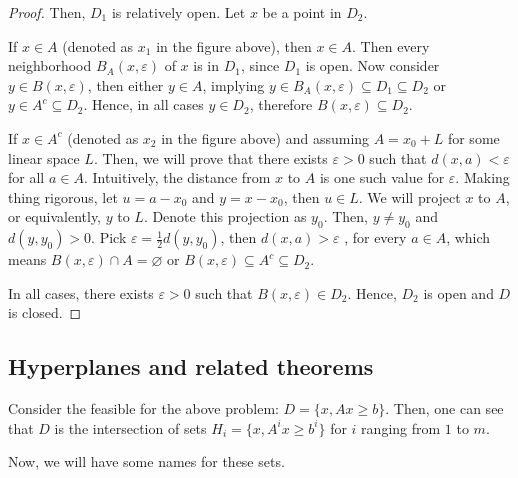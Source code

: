 \begin{proof}
  Then, \( D_{1} \) is relatively open. Let \( x \) be a point in \( D_{2} \).

  If \( x \in A \) (denoted as \( x_{1} \) in the figure above),
  then \( x \in A \). Then every neighborhood \( B_{A}(x,
  \varepsilon) \) of \( x \) is in \( D_{1} \), since \( D_{1} \) is open. Now
  consider \( y \in B(x, \varepsilon) \), then either \( y \in A \), implying \(
  y \in B_{A}(x, \varepsilon) \subseteq D_{1} \subseteq D_{2}\) or \( y \in
  A^{c} \subseteq D_{2} \). Hence, in all cases \( y \in D_{2} \), therefore \(
  B(x, \varepsilon) \subseteq D_{2}\).

  If \( x \in A^{c} \) (denoted as \( x_{2} \) in the figure above)
  and assuming \( A = x_{0} + L \) for some linear space \(
  L\). Then, we will prove that there exists \( \varepsilon > 0 \) such that \(
  d(x, a) < \varepsilon\) for all \( a \in A \). Intuitively, the distance from
  \( x \) to \( A \) is one such value for \( \varepsilon \).
  Making thing rigorous,
  let \( u = a - x_{0} \) and \( y = x - x_{0} \), then \( u \in L \). We will
  project \( x \) to \( A \), or equivalently, \( y \) to \( L \). Denote this
  projection as \( y_{0} \). Then, \( y \neq  y_{0} \) and \( d(y, y_{0}) > 0
  \). Pick \( \varepsilon = \frac{1}{2} d(y, y_{0}) \), then \( d(x, a) >
  \varepsilon \) , for every \( a \in A \), which means \( B(x, \varepsilon)
  \cap A = \varnothing \) or \( B(x, \varepsilon) \subseteq A^{c} \subseteq
  D_{2} \).

  In all cases, there exists \( \varepsilon > 0 \) such that \( B(x,
  \varepsilon) \in D_{2} \). Hence, \( D_{2} \) is open and \( D \) is closed.
\end{proof}



\subsection{Hyperplanes and related theorems} %
\label{sub:Hyperplanes and related theorems}

Consider the feasible for the above problem: \( D = \{x, Ax\ge b\}   \). Then,
one can see that \( D \) is the intersection of sets \( H_{i}=\{x, A^{i}x \ge
b^{i}\}   \) for \( i \) ranging from \( 1 \) to \( m \).

Now, we will have some names for these sets.

